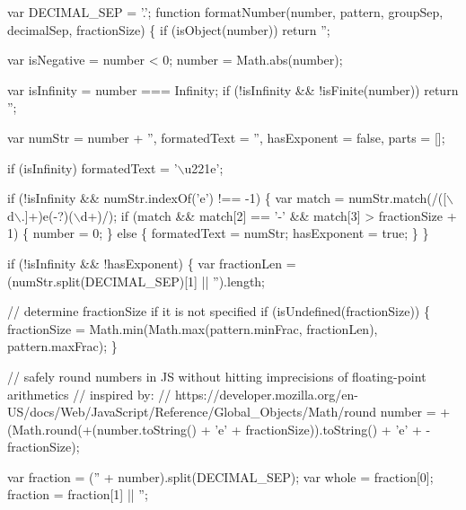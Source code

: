 \begin{DoxyCodeInclude}
{{{{var DECIMAL\_SEP = \textcolor{charliteral}{'.'};
\textcolor{keyword}{function} formatNumber(number, pattern, groupSep, decimalSep, fractionSize) \{
  \textcolor{keywordflow}{if} (isObject(number)) \textcolor{keywordflow}{return} \textcolor{stringliteral}{''};

  var isNegative = number < 0;
  number = Math.abs(number);

  var isInfinity = number === Infinity;
  \textcolor{keywordflow}{if} (!isInfinity && !isFinite(number)) \textcolor{keywordflow}{return} \textcolor{stringliteral}{''};

  var numStr = number + \textcolor{stringliteral}{''},
      formatedText = \textcolor{stringliteral}{''},
      hasExponent = \textcolor{keyword}{false},
      parts = [];

  \textcolor{keywordflow}{if} (isInfinity) formatedText = \textcolor{stringliteral}{'\(\backslash\)u221e'};

  \textcolor{keywordflow}{if} (!isInfinity && numStr.indexOf(\textcolor{charliteral}{'e'}) !== -1) \{
    var match = numStr.match(/([\(\backslash\)d\(\backslash\).]+)e(-?)(\(\backslash\)d+)/);
    \textcolor{keywordflow}{if} (match && match[2] == \textcolor{charliteral}{'-'} && match[3] > fractionSize + 1) \{
      number = 0;
    \} \textcolor{keywordflow}{else} \{
      formatedText = numStr;
      hasExponent = \textcolor{keyword}{true};
    \}
  \}

  \textcolor{keywordflow}{if} (!isInfinity && !hasExponent) \{
    var fractionLen = (numStr.split(DECIMAL\_SEP)[1] || \textcolor{stringliteral}{''}).length;

    \textcolor{comment}{// determine fractionSize if it is not specified}
    \textcolor{keywordflow}{if} (isUndefined(fractionSize)) \{
      fractionSize = Math.min(Math.max(pattern.minFrac, fractionLen), pattern.maxFrac);
    \}

    \textcolor{comment}{// safely round numbers in JS without hitting imprecisions of floating-point arithmetics}
    \textcolor{comment}{// inspired by:}
    \textcolor{comment}{// https://developer.mozilla.org/en-US/docs/Web/JavaScript/Reference/Global\_Objects/Math/round}
    number = +(Math.round(+(number.toString() + \textcolor{charliteral}{'e'} + fractionSize)).toString() + \textcolor{charliteral}{'e'} + -fractionSize);

    var fraction = (\textcolor{stringliteral}{''} + number).split(DECIMAL\_SEP);
    var whole = fraction[0];
    fraction = fraction[1] || \textcolor{stringliteral}{''};

}}}}
\end{DoxyCodeInclude}
